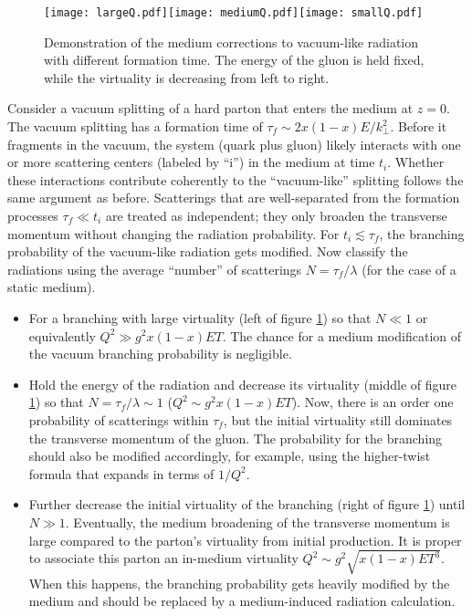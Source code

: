 \begin{figure}
\singlespacing
\texttt{[image: largeQ.pdf]}\texttt{[image: mediumQ.pdf]}\texttt{[image: smallQ.pdf]}
\caption[Demonstration of the medium corrections to vacuum-like radiation]{Demonstration of the medium corrections to vacuum-like radiation with different formation time. The energy of the gluon is held fixed, while the virtuality is decreasing from left to right.}
\label{fig:vac-med-interface}
\end{figure}

Consider a vacuum splitting of a hard parton that enters the medium at $z=0$.
The vacuum splitting has a formation time of $\tau_f \sim 2x(1-x)E/k_\perp^2$.
Before it fragments in the vacuum, the system (quark plus gluon) likely interacts with one or more scattering centers (labeled by ``i'') in the medium at time $t_i$.
Whether these interactions contribute coherently to the ``vacuum-like'' splitting follows the same argument as before.
Scatterings that are well-separated from the formation processes $\tau_f \ll t_i$ are treated as independent; they only broaden the transverse momentum without changing the radiation probability.
For $t_i \lesssim \tau_f$, the branching probability of the vacuum-like radiation gets modified.
Now classify the radiations using the average ``number'' of scatterings  $N = \tau_f/\lambda$ (for the case of a static medium).
\begin{itemize}
\item For a branching with large virtuality (left of figure \ref{fig:vac-med-interface}) so that $N \ll 1$ or equivalently $Q^2 \gg  g^2 x(1-x)E T$. 
The chance for a medium modification of the vacuum branching probability is negligible. 
\item Hold the energy of the radiation and decrease its virtuality (middle of figure \ref{fig:vac-med-interface}) so that $N = \tau_f/\lambda \sim 1$ ($Q^2 \sim g^2 x(1-x)E T$). 
Now, there is an order one probability of scatterings within $\tau_f$, but the initial virtuality still dominates the transverse momentum of the gluon.
The probability for the branching should also be modified accordingly, for example, using the higher-twist formula that expands in terms of $1/Q^2$.
\item Further decrease the initial virtuality of the branching (right of figure \ref{fig:vac-med-interface}) until $N \gg 1$.
Eventually, the medium broadening of the transverse momentum is large compared to the parton's virtuality from initial production.
It is proper to associate this parton an in-medium virtuality $Q^2 \sim g^2\sqrt{x(1-x)E T^3}$. 
When this happens, the branching probability gets heavily modified by the medium and should be replaced by a medium-induced radiation calculation.
\end{itemize}
